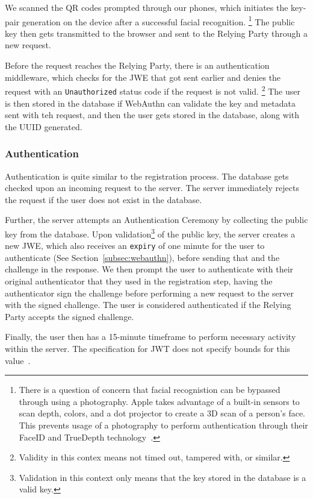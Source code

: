 We scanned the QR codes prompted through our phones, which initiates the
key-pair generation on the device after a successful facial recognition.
\footnote{
  There is a question of concern that facial recognistion can be bypassed
  through using a photography.
  Apple takes advantage of a built-in sensors to
  scan depth, colors, and a dot projector to create a 3D scan of a person's
  face.
  This prevents usage of a photography to perform authentication through
  their FaceID and TrueDepth technology~\cite{apple-support}.
}
The public key then gets transmitted to the browser and sent to the Relying
Party through a new request.

Before the request reaches the Relying Party, there is an authentication
middleware, which checks for the JWE that got sent earlier and denies the
request with an \texttt{Unauthorized} status code if the request is not valid.
\footnote{
  Validity in this contex means not timed out, tampered with, or similar.
}
The user is then stored in the database if WebAuthn can validate the key and
metadata sent with teh request, and then the user gets stored in the database,
along with the UUID generated.

\subsubsection{Authentication}
Authentication is quite similar to the registration process.
The database gets checked upon an incoming request to the server.
The server immediately rejects the request if the user does not exist in the
database.

Further, the server attempts an Authentication Ceremony by collecting the
public key from the database.
Upon validation\footnote{
  Validation in this context only means that the key stored in the database
  is a valid key.
} of the public key, the server creates a new JWE, which also receives an
\texttt{expiry} of one minute for the user to authenticate (See
Section~\ref{subsec:webauthn}), before sending that and the challenge in the
response.
We then prompt the user to authenticate with their original authenticator
that they used in the registration step, having the authenticator sign the
challenge before performing a new request to the server with the signed
challenge.
The user is considered authenticated if the Relying Party accepts the signed
challenge.

Finally, the user then has a 15-minute timeframe to perform necessary
activity within the server.
The specification for JWT does not specify bounds for this value~\cite{RFC7519}.

